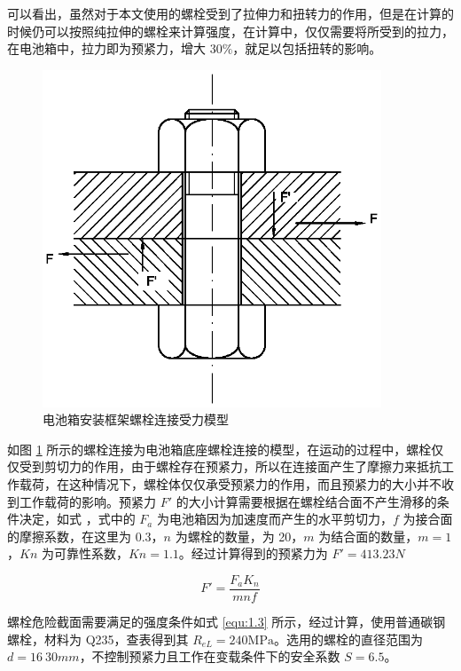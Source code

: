 可以看出，虽然对于本文使用的螺栓受到了拉伸力和扭转力的作用，但是在计算的时候仍可以按照纯拉伸的螺栓来计算强度，在计算中，仅仅需要将所受到的拉力，在电池箱中，拉力即为预紧力，增大 $30\%$，就足以包括扭转的影响。

\begin{figure}
	\centering
	\includegraphics[width=0.9\textwidth]{figures/jiaohe-Model.eps}
	\caption{电池箱安装框架螺栓连接受力模型}\label{fig:jiaohe}
\end{figure}

如图 \ref{fig:jiaohe} 所示的螺栓连接为电池箱底座螺栓连接的模型，在运动的过程中，螺栓仅仅受到剪切力的作用，由于螺栓存在预紧力，所以在连接面产生了摩擦力来抵抗工作载荷，在这种情况下，螺栓体仅仅承受预紧力的作用，而且预紧力的大小并不收到工作载荷的影响。预紧力 $F'$ 的大小计算需要根据在螺栓结合面不产生滑移的条件决定，如式 ，式中的 $F_a$ 为电池箱因为加速度而产生的水平剪切力，$f$ 为接合面的摩擦系数，在这里为 $0.3$，$n$ 为螺栓的数量，为 20，$m$ 为结合面的数量，$m=1$，$Kn$ 为可靠性系数，$Kn=1.1$。经过计算得到的预紧力为 $F'= 413.23 N$

\begin{equation}
	F'=\frac{F_aK_n}{mnf}
\end{equation}

螺栓危险截面需要满足的强度条件如式 \ref{equ:1.3} 所示，经过计算，使用普通碳钢螺栓，材料为 Q235，查表得到其 $R_{eL}=240 \mathrm{MPa}$。选用的螺栓的直径范围为 $d=16~30 mm$，不控制预紧力且工作在变载条件下的安全系数 $S=6.5$。

